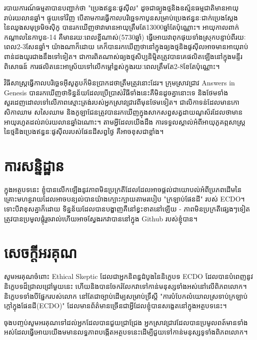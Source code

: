 \documentclass[10pt,twocolumn,letterpaper]{article}
\begin{document}
របាយការណ៍ធម្មតាបានបញ្ជាក់ថា "ប្រេងឥន្ធនៈផូសុីល" ដូចជាធ្យូងថ្មនិងឧស្ម័នធម្មជាតិមានអាយុរាប់រយលានឆ្នាំ\cite{104}។ ផ្ទុយទៅវិញ បើតាមការធ្វើកាលបរិច្ឆេទកាបូនសម្រាប់ប្រេងឥន្ធនៈជាក់ប្រេងស្តែងនៃឈូងសមុទ្រមិចស៊ិកូ បានរកឃើញថាវាមានអាយុត្រឹមតែ13000ឆ្នាំតែប៉ុណ្ណោះ\cite{105}។ អាយុកាលពាក់កណ្តាលនៃកាបូន-14 គឺមានរយៈពេលខ្លីណាស់(5730ឆ្នាំ) ធ្វើអោយវាពុកផុយទាំងស្រុកបន្ទាប់ពីរយៈពេល2-3សែនឆ្នាំ។ យ៉ាងណាក៏ដោយ គេក៏បានរកឃើញថានៅក្នុងធ្យងថ្មនិងផូសុីលអាចមានអាយុរាប់ពាន់ដងយូរជាងនឹងទៅទៀត\cite{106}។ ជាការពិតណាស់ធ្យងថ្មសិប្បនិម្មិតត្រូវបានគេផលិតឡើងនៅក្នុងមន្ទីរពិសោធន៍ ការផលិតនេះអាស្រ័យទៅលើកម្តៅខ្ពស់ក្នុងរយៈពេលត្រឹមតែ2-8ខែតែប៉ុណ្ណោះ\cite{107}។

វិធីសាស្ត្រធ្វើកាលបរិច្ឆេទអុីសូតូបក៏មិនប្រាកដថាត្រឹមត្រូវនោះដែរ។ ក្រុមស្រាវជ្រាវ Answers in Genesis បានរកឃើញថាទិន្នន័យដែលប្រើប្រាស់វិធីទាំងនេះគឺមិនដូចគ្នានោះទេ និងថែមទាំងសួរដេញដោលទៅលើភាពស្មោះត្រង់របស់អ្នកស្រាវជ្រាវពីមុនថែមទៀត\cite{108}។ ជាលិកាទន់ដែលមានកោសិកាឈាម សសៃឈាម និងកូឡាជែនត្រូវបានរកឃើញក្នុងសាកសព្វសត្វដាយណូស័រដែលថាមានអាយុរហូតដល់រាប់រយលានឆ្នាំឯណោះ\cite{109,110}។ តាមអ្វីដែលយើងដឹង ការទទួលស្គាល់អំពីអាយុភូគព្ភសាស្ត្រនៃថ្មនិងប្រេងឥន្ធនៈផូសុីលរបស់ផែនដីសព្វថ្ងៃ គឺអាចខុសជាខ្លាំង។ 

\section{ការសន្និដ្ឋាន}

ក្នុងអត្ថបទនេះ ខ្ញុំបានលើកឡើងនូវភាពមិនប្រក្រតីដែលដែលអាចផ្តល់ជាយោបល់អំពីប្រភពដើមនៃគ្រោះមហន្ថរាយដែលអាចបន្យល់បានយ៉ាងក្បោះក្បាយតាមរបៀប "ក្រឡាប់ផែនដី" របស់ ECDO។ ទោះបីវាខុសគ្នាក៏ដោយ ទិន្នន័យដែលបានបង្ហាញគឺនៅខ្វះខាតនៅឡើយ - ភាពមិនប្រក្រតីផ្សេងៗទៀតត្រូវបានប្រមូលផ្តុំរួចរាល់ហើយអាចស្វែងរកវាបាននៅក្នុង Github របស់ខ្ញុំបាន\cite{2}។
\section{សេចក្ដីអរគុណ}

សូមអរគុណចំពោះ Ethical Skeptic ដែលជាអ្នកនិពន្ធដំបូងនៃនិក្ខេបទ ECDO ដែលបានបំពេញនូវនិក្ខេបទដ៏ជ្រាលជ្រៅមួយនេះ ហើយនិងបានចែករំលែកវាទៅកាន់មនុស្សទាំងអស់នៅលើពិភពលោក។ និក្ខេបទទាំងបីផ្នែករបស់លោក\cite{1} នៅតែជាច្បាប់ដើម្បសម្រាប់ទ្រឹស្តី "ការបំបែកលំយោលស្រទាប់ក្រឡាប់ក្តៅក្នុងផែនដី(ECDO)" ដែលមានព័ត៌មានច្រើនជាអ្វីដែលខ្ញុំបានសង្ខេតនៅក្នុងអត្ថបទនេះ។

ចុងបញ្ចប់សូមអរគុណទៅដល់អ្នកដែលបានជួយជ្រាជ្រែង អ្នកស្រាវជ្រាវដែលបានប្រមូលពត៍មានទាំងអស់ដែលធ្វើអោយយើងមមានលទ្ធភាពបង្កើតអត្ថបទនេះដើម្បីជួយទៅកាន់មនុស្សទូទាំងពិភពលោក។

\clearpage
\twocolumn

{\small
\renewcommand{\refname}{ឯកសារយោង}


}
\end{document}
